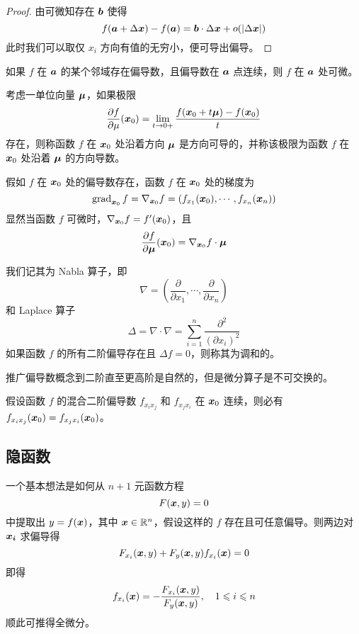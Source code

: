 \begin{proof}
	由可微知存在 $\boldsymbol{b}$ 使得
	\[ f(\boldsymbol{a} + \Delta \boldsymbol{x}) - f(\boldsymbol{a}) = \boldsymbol{b} \cdot \Delta \boldsymbol{x} + o(|\Delta \boldsymbol{x}|) \]
	此时我们可以取仅 $x_i$ 方向有值的无穷小，便可导出偏导。
\end{proof}

\begin{theorem}
	如果 $f$ 在 $\boldsymbol{a}$ 的某个邻域存在偏导数，且偏导数在 $\boldsymbol{a}$ 点连续，则 $f$ 在 $\boldsymbol{a}$ 处可微。
\end{theorem}

考虑一单位向量 $\boldsymbol{\mu}$，如果极限
\[ \frac{\partial f}{\partial \mu}(\boldsymbol{x}_0) = \lim_{t \to 0+} \frac{f(\boldsymbol{x}_0 + t \boldsymbol{\mu}) - f(\boldsymbol{x}_0)}{t} \]
存在，则称函数 $f$ 在 $\boldsymbol{x}_0$ 处沿着方向 $\boldsymbol{\mu}$ 是方向可导的，并称该极限为函数 $f$ 在 $\boldsymbol{x}_0$ 处沿着 $\boldsymbol{\mu}$ 的方向导数。

假如 $f$ 在 $\boldsymbol{x}_0$ 处的偏导数存在，函数 $f$ 在 $\boldsymbol{x}_0$ 处的梯度为
\[ \operatorname{grad}_{\boldsymbol{x}_0} f = \nabla_{\boldsymbol{x}_0} f = \left( f_{x_1}(\boldsymbol{x}_0), \cdots, f_{x_n}(\boldsymbol{x}_n) \right) \]
显然当函数 $f$ 可微时，$\nabla_{\boldsymbol{x}_0} f = f'(\boldsymbol{x}_0)$，且
\[ \frac{\partial f}{\partial \boldsymbol{\mu}} (\boldsymbol{x}_0) = \nabla_{\boldsymbol{x}_0} f \cdot \boldsymbol{\mu} \]

我们记其为 Nabla 算子，即
\[ \nabla = \left( \frac{\partial}{\partial x_1}, \cdots, \frac{\partial}{\partial x_n} \right) \]
和 Laplace 算子
\[ \Delta = \nabla \cdot \nabla = \sum_{i=1}^{n} \frac{\partial^2}{(\partial x_i)^2} \]
如果函数 $f$ 的所有二阶偏导存在且 $\Delta f = 0$，则称其为调和的。

推广偏导数概念到二阶直至更高阶是自然的，但是微分算子是不可交换的。

\begin{theorem}
	假设函数 $f$ 的混合二阶偏导数 $f_{x_i x_j}$ 和 $f_{x_j x_i}$ 在 $\boldsymbol{x}_0$ 连续，则必有 $f_{x_i x_j}(\boldsymbol{x}_0) = f_{x_j x_i}(\boldsymbol{x}_0)$。
\end{theorem}

\subsection{隐函数}

一个基本想法是如何从 $n+1$ 元函数方程
\[ F(\boldsymbol{x}, y) = 0 \]
中提取出 $y = f(\boldsymbol{x})$，其中 $\boldsymbol{x} \in \mathbb{R}^n$，假设这样的 $f$ 存在且可任意偏导。则两边对 $\boldsymbol{x_i}$ 求偏导得
\[ F_{x_i}(\boldsymbol{x}, y) + F_{y}(\boldsymbol{x}, y) f_{x_i}(\boldsymbol{x}) = 0 \]
即得
\[ f_{x_i}(\boldsymbol{x}) = -\frac{F_{x_i}(\boldsymbol{x}, y)}{F_{y}(\boldsymbol{x}, y)}, \quad 1 \leqslant i \leqslant n \]
顺此可推得全微分。

